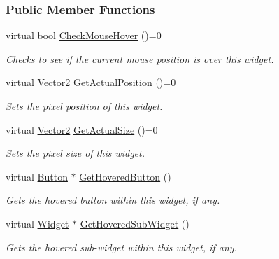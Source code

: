 \subsubsection*{Public Member Functions}
\begin{DoxyCompactItemize}
\item 
virtual bool \hyperlink{classphys_1_1UI_1_1Widget_a613df6dbb42efe139d185043a00259dc}{CheckMouseHover} ()=0
\begin{DoxyCompactList}\small\item\em Checks to see if the current mouse position is over this widget. \item\end{DoxyCompactList}\item 
virtual \hyperlink{classphys_1_1Vector2}{Vector2} \hyperlink{classphys_1_1UI_1_1Widget_a0a29fecff7f56d7909f65fd63b0990e7}{GetActualPosition} ()=0
\begin{DoxyCompactList}\small\item\em Sets the pixel position of this widget. \item\end{DoxyCompactList}\item 
virtual \hyperlink{classphys_1_1Vector2}{Vector2} \hyperlink{classphys_1_1UI_1_1Widget_af3a685621ed220748c0940ea38c96ed2}{GetActualSize} ()=0
\begin{DoxyCompactList}\small\item\em Sets the pixel size of this widget. \item\end{DoxyCompactList}\item 
virtual \hyperlink{classphys_1_1UI_1_1Button}{Button} $\ast$ \hyperlink{classphys_1_1UI_1_1Widget_ab563c13db418e4c3ff0a0dd766550251}{GetHoveredButton} ()
\begin{DoxyCompactList}\small\item\em Gets the hovered button within this widget, if any. \item\end{DoxyCompactList}\item 
virtual \hyperlink{classphys_1_1UI_1_1Widget}{Widget} $\ast$ \hyperlink{classphys_1_1UI_1_1Widget_a38764b73bc6087e2611660735840ba3f}{GetHoveredSubWidget} ()
\begin{DoxyCompactList}\small\item\em Gets the hovered sub-\/widget within this widget, if any. \item\end{DoxyCompactList}\item 

\end{DoxyCompactItemize}
